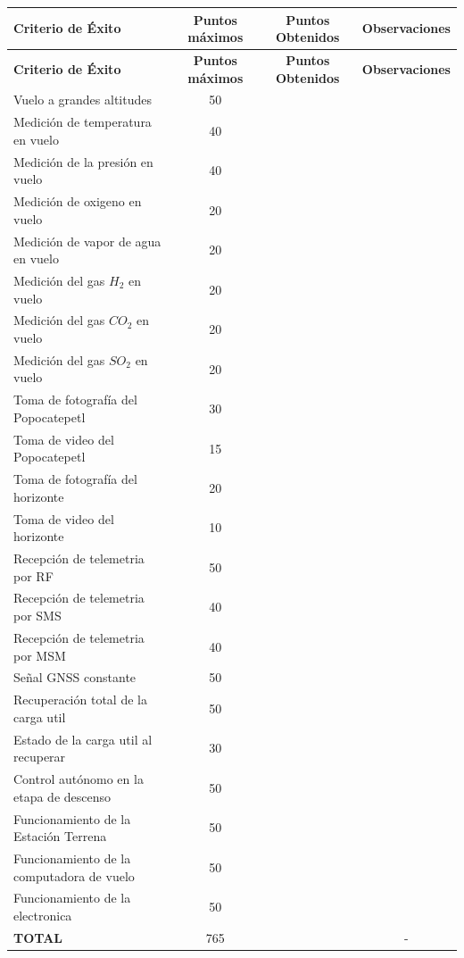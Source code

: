 \documentclass[letterpaper,12pt]{article} %
\begin{document}
    \begin{longtable}{|m{4.1cm}|c|c|c|}
    \hline
    \textbf{Criterio de Éxito} & \textbf{Puntos máximos} & \textbf{Puntos Obtenidos} & \textbf{Observaciones} \\
    \hline
    \endfirsthead
    \hline
    \textbf{Criterio de Éxito} & \textbf{Puntos máximos} & \textbf{Puntos Obtenidos} & \textbf{Observaciones} \\
    \hline
    \endhead
    Vuelo a grandes altitudes & 50 &  & \\
    \midrule
    Medición de temperatura en vuelo & 40 &  & \\
    \midrule
    Medición de la presión en vuelo & 40 &  & \\
    \midrule
    Medición de oxigeno en vuelo & 20 &  & \\
    \midrule
    Medición de vapor de agua en vuelo & 20 &  & \\
    \midrule
    Medición del gas $H_{2}$ en vuelo & 20 &  & \\
    \midrule
    Medición del gas $CO_{2}$ en vuelo & 20 &  & \\
    \midrule
    Medición del gas $SO_{2}$ en vuelo & 20 &  & \\
    \midrule
    Toma de fotografía del Popocatepetl & 30 &  & \\
    \midrule
    Toma de video del Popocatepetl & 15 &  & \\
    \midrule
    Toma de fotografía del horizonte & 20 &  & \\
    \midrule
    Toma de video del horizonte & 10 &  & \\
    \midrule
    Recepción de telemetria por RF & 50 &  & \\
    \midrule
    Recepción de telemetria por SMS & 40 &  & \\
    \midrule
    Recepción de telemetria por MSM & 40 &  & \\
    \midrule
    Señal GNSS constante & 50 &  & \\
    \midrule
    Recuperación total de la carga util & 50 &  & \\
    \midrule
    Estado de la carga util al recuperar & 30 &  & \\
    \midrule
    Control autónomo en la etapa de descenso & 50 & & \\
    \midrule
    Funcionamiento de la Estación Terrena & 50 &  & \\
    \midrule
    Funcionamiento de la computadora de vuelo & 50 &  & \\
    \midrule
    Funcionamiento de la electronica & 50 &  & \\
    \midrule
    \textbf{TOTAL} & 765 &  & -\\
    \hline
    \end{longtable}
\end{document}
